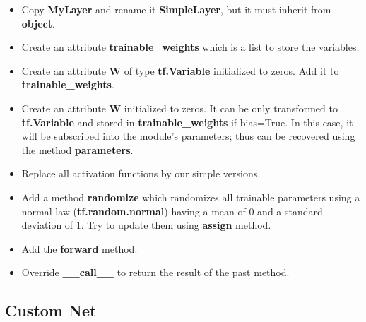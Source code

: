 \documentclass[11pt, a4paper]{article}
\begin{document}
\begin{multicols}{2}
	\begin{itemize}  
		\item Copy \textbf{MyLayer} and rename it \textbf{SimpleLayer}, but it must inherit from \textbf{object}.
		\item Create an attribute \textbf{trainable\_weights} which is a list to store the variables.
		\item Create an attribute \textbf{W} of type \textbf{tf.Variable} initialized to zeros.
		Add it to \textbf{trainable\_weights}.
		\item Create an attribute \textbf{W} initialized to zeros. 
		It can be only transformed to \textbf{tf.Variable} and stored in \textbf{trainable\_weights} if bias=True.
		In this case, it will be subscribed into the module's parameters; thus can be recovered using the method \textbf{parameters}.
		\item Replace all activation functions by our simple versions.
		\item Add a method \textbf{randomize} which randomizes all trainable parameters using a normal law (\textbf{tf.random.normal}) having a mean of 0 and a standard deviation of 1.
		Try to update them using \textbf{assign} method.
		\item Add the \textbf{forward} method.
		\item Override \textbf{\_\_call\_\_} to return the result of the past method.
	\end{itemize}
	
	\subsection{Custom Net}
	

\end{multicols}
\end{document}
